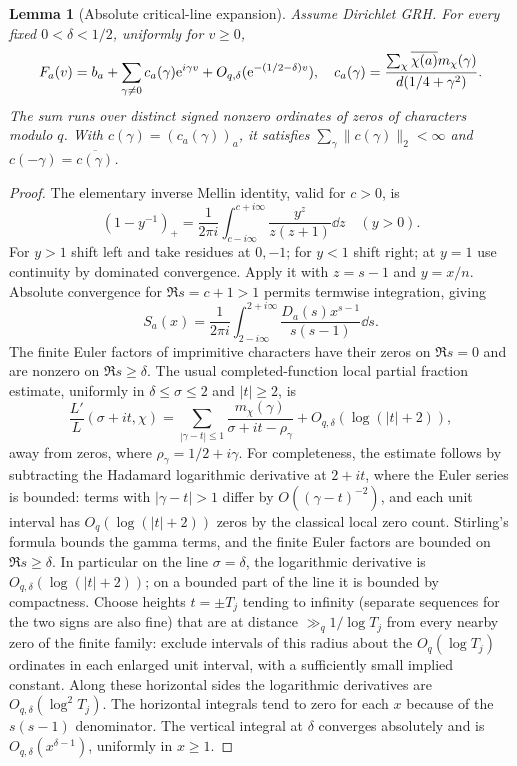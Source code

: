 \documentclass[11pt]{article}
\newtheorem{lemma}[theorem]{Lemma}
\theoremstyle{remark}\newtheorem{remark}[theorem]{Remark}
\begin{document}
\begin{lemma}[Absolute critical-line expansion]\label{lem:expansion}
Assume Dirichlet GRH. For every fixed $0<\delta<1/2$, uniformly for $v\ge0$,
\[
 F_a(v)=b_a+\sum_{\gamma\ne0} c_a(\gamma)\mathrm e^{i\gamma v}
       +O_{q,\delta}(\mathrm e^{-(1/2-\delta)v}),\quad
 c_a(\gamma)=\frac{\sum_\chi\overline{\chi(a)}m_\chi(\gamma)}{d(1/4+\gamma^2)}.
\]
The sum runs over distinct signed nonzero ordinates of zeros of characters modulo $q$. With $c(\gamma)=(c_a(\gamma))_a$, it satisfies $\sum_\gamma\|c(\gamma)\|_2<\infty$ and $c(-\gamma)=\overline{c(\gamma)}$.
\end{lemma}
\begin{proof}
The elementary inverse Mellin identity, valid for $c>0$, is
\[
 (1-y^{-1})_+=\frac1{2\pi i}\int_{c-i\infty}^{c+i\infty}
                       \frac{y^z}{z(z+1)}\dd z\quad (y>0).
\]
For $y>1$ shift left and take residues at $0,-1$; for $y<1$ shift right; at $y=1$ use continuity by dominated convergence. Apply it with $z=s-1$ and $y=x/n$. Absolute convergence for $\Re s=c+1>1$ permits termwise integration, giving
\[
 S_a(x)=\frac1{2\pi i}\int_{2-i\infty}^{2+i\infty}\frac{D_a(s)x^{s-1}}{s(s-1)}\dd s.
\]
The finite Euler factors of imprimitive characters have their zeros on $\Re s=0$ and are nonzero on $\Re s\ge\delta$. The usual completed-function local partial fraction estimate, uniformly in $\delta\le\sigma\le2$ and $|t|\ge2$, is
\[
 \frac{L'}{L}(\sigma+it,\chi)=\sum_{|\gamma-t|\le1}\frac{m_\chi(\gamma)}{\sigma+it-\rho_\gamma}
 +O_{q,\delta}(\log(|t|+2)),
\]
away from zeros, where $\rho_\gamma=1/2+i\gamma$. For completeness, the estimate follows by subtracting the Hadamard logarithmic derivative at $2+it$, where the Euler series is bounded: terms with $|\gamma-t|>1$ differ by $O((\gamma-t)^{-2})$, and each unit interval has $O_q(\log(|t|+2))$ zeros by the classical local zero count. Stirling's formula bounds the gamma terms, and the finite Euler factors are bounded on $\Re s\ge\delta$. In particular on the line $\sigma=\delta$, the logarithmic derivative is $O_{q,\delta}(\log(|t|+2))$; on a bounded part of the line it is bounded by compactness. Choose heights $t=\pm T_j$ tending to infinity (separate sequences for the two signs are also fine) that are at distance $\gg_q1/\log T_j$ from every nearby zero of the finite family: exclude intervals of this radius about the $O_q(\log T_j)$ ordinates in each enlarged unit interval, with a sufficiently small implied constant. Along these horizontal sides the logarithmic derivatives are $O_{q,\delta}(\log^2 T_j)$. The horizontal integrals tend to zero for each $x$ because of the $s(s-1)$ denominator. The vertical integral at $\delta$ converges absolutely and is $O_{q,\delta}(x^{\delta-1})$, uniformly in $x\ge1$.


\end{proof}
\end{document}
